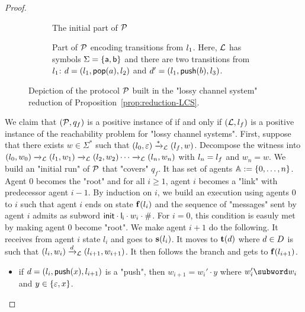 \begin{proof}
	\begin{figure}
	\begin{subfigure}[b]{0.99\textwidth}
	\centering
	
	\caption{The initial part of $\mathcal{P}$}\label{fig:lcs-choice}
	\end{subfigure}
	\begin{subfigure}[b]{0.99\textwidth}
	\centering
	
	\caption{Part of $\mathcal{P}$ encoding transitions from $l_1$. Here, $\mathcal{L}$ has symbols $\Sigma = \{\mathsf{a},\mathsf{b}\}$ and there are two transitions from $l_1$: $d = (l_1, \mathsf{pop}(a), l_2)$ and $d' = (l_1, \mathsf{push}(b), l_3)$.}\label{fig:lcs-trans}
	\end{subfigure}
	\caption{Depiction of the protocol $\mathcal{P}$ built in the "lossy channel system" reduction of Proposition~\ref{prop:reduction-LCS}.}
	\end{figure}
	We claim that $(\mathcal{P}, q_f)$ is a positive instance of \COVER if and only if $(\mathcal{L}, l_f)$ is a positive instance of the reachability problem for "lossy channel systems".
	First, suppose that there exists $w \in \Sigma^*$ such that $(l_0, \varepsilon) \xrightarrow{*}_{\mathcal{L}} (l_f, w)$. Decompose the witness into $(l_0, w_0) \xrightarrow{}_{\mathcal{L}} (l_1, w_1) \xrightarrow{}_{\mathcal{L}} (l_2, w_2) \cdots \xrightarrow{}_{\mathcal{L}} (l_n,w_n)$ with $l_n = l_f$ and $w_n =w$. 
	We build an "initial run" of $\mathcal{P}$ that "covers" $q_f$. It has set of agents $\mathbb{A} := \{0,\dots, n\}$. Agent $0$ becomes the "root" and for all $i \geq 1$, agent $i$ becomes a "link" with predecessor agent $i-1$. By induction on $i$, we build an execution using agents $0$ to $i$ such that agent $i$ ends on state $\mathbf{f}(l_i)$ and the sequence of "messages" sent by agent $i$ admits as subword $\mathsf{init} \cdot \mathsf{l_i} \cdot w_i \cdot \mathsf{\#}$. For $i=0$, this condition is easuly met by making agent $0$ become "root". We make agent $i+1$ do the following. It receives from agent $i$ state $l_i$ and goes to $\mathbf{s}(l_i)$. It moves to $\mathbf{t}(d)$ where $d \in D$ is such that $(l_i, w_i) \xrightarrow{d}_{\mathcal{L}} (l_{i+1}, w_{i+1})$. It then follows the branch and gets to $\mathbf{f}(l_{i+1})$. 
	\begin{itemize}
		\item if $d =(l_i,\mathsf{push}(x), l_{i+1})$ is a "push", then $w_{i+1} = w_{i}' \cdot y$ where $w_i' \subword w_i$ and $y \in \{\varepsilon, x\}$. 

\end{itemize}
\end{proof}
